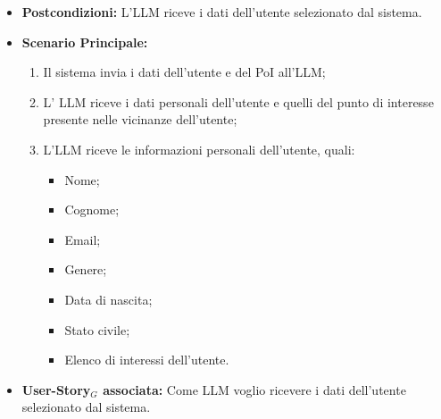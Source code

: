\documentclass[11pt]{article}
\begin{document}
\begin{justify}
\begin{itemize}
      \item \textbf{Postcondizioni:} L'LLM riceve i dati dell'utente selezionato dal sistema.
    \item \textbf{Scenario Principale:} 
        \begin{enumerate}
          \item Il sistema invia i dati dell'utente e del PoI all'LLM;
        \item L' LLM riceve i dati personali dell'utente e quelli del punto di interesse presente nelle vicinanze dell'utente;
          \item L'LLM riceve le informazioni personali dell'utente, quali:
          \begin{itemize}
          \item Nome;
          \item Cognome;
          \item Email;
          \item Genere;
          \item Data di nascita;
          \item Stato civile;
          \item Elenco di interessi dell'utente.
          \end{itemize}
        \end{enumerate}
      \item \textbf{User-Story$_G$ associata:} Come LLM voglio ricevere i dati dell'utente selezionato dal sistema.
\end{itemize}

\end{justify}
\end{document}
